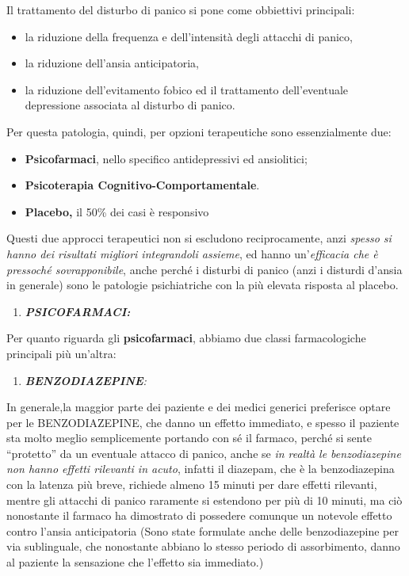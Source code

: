 \documentclass[]{article}
\begin{document}
Il trattamento del disturbo di panico si pone come obbiettivi
principali:

\begin{itemize}
\item
  la riduzione della frequenza e dell'intensità degli attacchi di
  panico,
\item
  la riduzione dell'ansia anticipatoria,
\item
  la riduzione dell'evitamento fobico ed il trattamento dell'eventuale
  depressione associata al disturbo di panico.
\end{itemize}

Per questa patologia, quindi, per opzioni terapeutiche sono
essenzialmente due:

\begin{itemize}
\item
  \textbf{Psicofarmaci}, nello specifico antidepressivi ed ansiolitici;
\item
  \textbf{Psicoterapia Cognitivo-Comportamentale}.
\item
  \textbf{Placebo,} il 50\% dei casi è responsivo
\end{itemize}

Questi due approcci terapeutici non si escludono reciprocamente, anzi
\emph{spesso si hanno dei risultati migliori integrandoli assieme}, ed
hanno un'\emph{efficacia che è pressoché sovrapponibile}, anche perché i
disturbi di panico (anzi i disturdi d'ansia in generale) sono le
patologie psichiatriche con la più elevata risposta al placebo.

\begin{enumerate}
\def\labelenumi{\arabic{enumi}.}
\item
  \textbf{\emph{PSICOFARMACI:}}
\end{enumerate}

Per quanto riguarda gli \textbf{psicofarmaci}, abbiamo due classi
farmacologiche principali più un'altra:

\begin{enumerate}
\def\labelenumi{\arabic{enumi}.}
\item
  \emph{\textbf{BENZODIAZEPINE}:}
\end{enumerate}

In generale,la maggior parte dei paziente e dei medici generici
preferisce optare per le BENZODIAZEPINE, che danno un effetto immediato,
e spesso il paziente sta molto meglio semplicemente portando con sé il
farmaco, perché si sente ``protetto'' da un eventuale attacco di panico,
anche se \emph{in realtà le benzodiazepine non hanno effetti rilevanti
in acuto}, infatti il diazepam, che è la benzodiazepina con la latenza
più breve, richiede almeno 15 minuti per dare effetti rilevanti, mentre
gli attacchi di panico raramente si estendono per più di 10 minuti, ma
ciò nonostante il farmaco ha dimostrato di possedere comunque un
notevole effetto contro l'ansia anticipatoria (Sono state formulate
anche delle benzodiazepine per via sublinguale, che nonostante abbiano
lo stesso periodo di assorbimento, danno al paziente la sensazione che
l'effetto sia immediato.)
\end{document}
